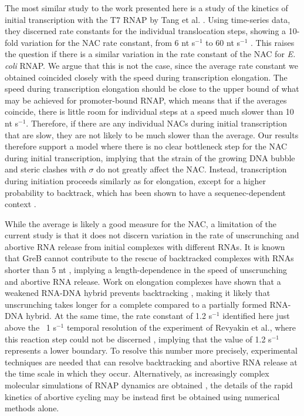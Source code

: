 The most similar study to the work presented here is a study of the kinetics
of initial transcription with the T7 RNAP by Tang et al.
\cite{tang_real-time_2009}. Using time-series data, they discerned rate
constants for the individual translocation steps, showing a 10-fold variation
for the NAC rate constant, from 6 nt s$^{-1}$ to 60 nt s$^{-1}$
\cite{tang_real-time_2009}. This raises the question if there is a similar
variation in the rate constant of the NAC for \textit{E. coli} RNAP. We 
argue that this is not the case, since the average rate constant we obtained
coincided closely with the speed during transcription elongation. The speed
during transcription elongation should be close to the upper bound of what may
be achieved for promoter-bound RNAP, which means that if the averages
coincide, there is little room for individual steps at a speed much slower than
10 nt s$^{-1}$. Therefore, if there are any individual NACs during
initial transcription that are slow, they are not likely to be much slower
than the average. Our results therefore support a model where there is no
clear bottleneck step for the NAC during initial transcription, implying that
the strain of the growing DNA bubble and steric clashes with $\sigma$ do
not greatly affect the NAC. Instead, transcription during initiation proceeds
similarly as for elongation, except for a higher probability to backtrack,
which has been shown to have a sequenec-dependent context
\cite{skancke_sequence-dependent_2015}.


While the average is likely a good measure for the NAC, a limitation of the
current study is that it does not discern variation in the rate of unscrunching
and abortive RNA release from initial complexes with different RNAs. It is
known that GreB cannot contribute to the rescue of backtracked complexes with
RNAs shorter than 5 nt \cite{hsu_initial_2006}, implying a length-dependence
in the speed of unscrunching and abortive RNA release. Work on elongation
complexes have shown that a weakened RNA-DNA hybrid prevents backtracking
\cite{nudler_rnadna_1997}, making it likely that unscrunching takes longer for
a complete compared to a partially formed RNA-DNA hybrid. At the same time,
the rate constant of 1.2 s$^{-1}$ identified here just above the ~1 s$^{-1}$
temporal resolution of the experiment of Revyakin et al., where this reaction
step could not be discerned \cite{revyakin_abortive_2006}, implying that the
value of 1.2 s$^{-1}$ represents a lower boundary. To resolve this number more
precisely, experimental techniques are needed that can resolve backtracking
and abortive RNA release at the time scale in which they occur. Alternatively,
as increasingly complex molecular simulations of RNAP dynamics are obtained
\cite{silva_millisecond_2014}, the details of the rapid kinetics of abortive
cycling may be instead first be obtained using numerical methods alone.

